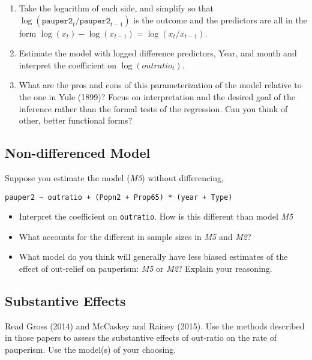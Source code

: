 \documentclass[]{article}
\providecommand{\tightlist}{%
  \setlength{\itemsep}{0pt}\setlength{\parskip}{0pt}}
\begin{document}
\begin{enumerate}
\def\labelenumi{\arabic{enumi}.}
\tightlist
\item
  Take the logarithm of each side, and simplify so that
  \(\log(\mathtt{pauper2}_t/\mathtt{pauper2}_{t -1})\) is the outcome
  and the predictors are all in the form
  \(\log(x_t) - \log(x_{t - 1}) = \log(x_t / x_{t - 1})\).
\item
  Estimate the model with logged difference predictors, Year, and month
  and interpret the coefficient on \(\log(outratio_t)\).
\item
  What are the pros and cons of this parameterization of the model
  relative to the one in Yule (1899)? Focus on interpretation and the
  desired goal of the inference rather than the formal tests of the
  regression. Can you think of other, better functional forms?
\end{enumerate}

\subsection{Non-differenced Model}\label{non-differenced-model}

Suppose you estimate the model (\emph{M5}) without differencing,

\begin{verbatim}
pauper2 ~ outratio + (Popn2 + Prop65) * (year + Type)
\end{verbatim}

\begin{itemize}
\tightlist
\item
  Interpret the coefficient on \texttt{outratio}. How is this different
  than model \emph{M5}
\item
  What accounts for the different in sample sizes in \emph{M5} and
  \emph{M2}?
\item
  What model do you think will generally have less biased estimates of
  the effect of out-relief on pauperism: \emph{M5} or \emph{M2}? Explain
  your reasoning.
\end{itemize}

\subsection{Substantive Effects}\label{substantive-effects}

Read Gross (2014) and McCaskey and Rainey (2015). Use the methods
described in those papers to assess the substantive effects of out-ratio
on the rate of pauperism. Use the model(s) of your choosing.
\end{document}
